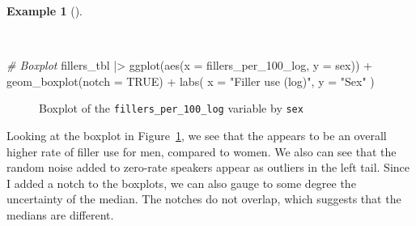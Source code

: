 \documentclass[
  letterpaper,
]{latex/krantz}
\newenvironment{Shaded}{\begin{snugshade}}{\end{snugshade}}
\newcommand{\AttributeTok}[1]{\textcolor[rgb]{0.00,0.00,0.00}{#1}}
\newcommand{\CommentTok}[1]{\textcolor[rgb]{0.00,0.00,0.00}{\textit{#1}}}
\newcommand{\ConstantTok}[1]{\textcolor[rgb]{0.00,0.00,0.00}{#1}}
\newcommand{\FunctionTok}[1]{\textcolor[rgb]{0.00,0.00,0.00}{#1}}
\newcommand{\NormalTok}[1]{\textcolor[rgb]{0.00,0.00,0.00}{#1}}
\newcommand{\SpecialCharTok}[1]{\textcolor[rgb]{0.00,0.00,0.00}{#1}}
\newcommand{\StringTok}[1]{\textcolor[rgb]{0.00,0.00,0.00}{#1}}
\theoremstyle{definition}
\newtheorem{example}{Example}[chapter]
\theoremstyle{remark}
\begin{document}
\begin{example}[]\protect\hypertarget{exm-ida-num-bi-vis}{}\label{exm-ida-num-bi-vis}

~

\begin{Shaded}
\begin{Highlighting}[]
\CommentTok{\# Boxplot}
\NormalTok{fillers\_tbl }\SpecialCharTok{|\textgreater{}}
  \FunctionTok{ggplot}\NormalTok{(}\FunctionTok{aes}\NormalTok{(}\AttributeTok{x =}\NormalTok{ fillers\_per\_100\_log, }\AttributeTok{y =}\NormalTok{ sex)) }\SpecialCharTok{+}
  \FunctionTok{geom\_boxplot}\NormalTok{(}\AttributeTok{notch =} \ConstantTok{TRUE}\NormalTok{) }\SpecialCharTok{+}
  \FunctionTok{labs}\NormalTok{(}
    \AttributeTok{x =} \StringTok{"Filler use (log)"}\NormalTok{,}
    \AttributeTok{y =} \StringTok{"Sex"}
\NormalTok{  )}
\end{Highlighting}
\end{Shaded}

\begin{figure}[H]


\caption{\label{fig-ida-num-bi-vis}Boxplot of the
\texttt{fillers\_per\_100\_log} variable by \texttt{sex}}

\end{figure}%

\end{example}

Looking at the boxplot in Figure~\ref{fig-ida-num-bi-vis}, we see that
the appears to be an overall higher rate of filler use for men, compared
to women. We also can see that the random noise added to zero-rate
speakers appear as outliers in the left tail. Since I added a notch to
the boxplots, we can also gauge to some degree the uncertainty of the
median. The notches do not overlap, which suggests that the medians are
different.
\end{document}
